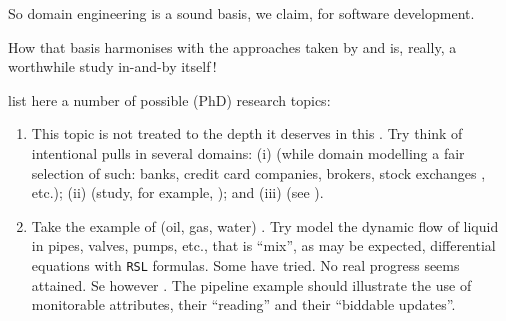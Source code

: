 \pind So domain engineering is a sound basis, we claim, for software
      development.

\pind How that basis harmonises with the approaches taken by
      \cite{Lamsweerde} and 
      \cite{Jackson2010Facs} is, really, a worthwhile study    
      in-and-by itself\,!
\afslut
\afslut

\label{Possible Research Topics}

\begynd
\pind {} list here a number of possible (PhD) research topics:
\begin{enumerate}
\item \label{rp:Intentional Pull}  This topic is not treated to the depth
      it deserves in this \primer. Try think of intentional pulls in
      several domains: (i) 
      (while domain modelling a fair selection of such: banks, credit
      card companies, brokers, stock exchanges \cite{db:tse:2010},
      etc.); (ii)  (study, for example,
      \cite{db04:railway,db97:r:UNUIIST:93,train-ifip-wcc2004-db1,train-ifip-wcc2004-mp,%
            train-ifip-wcc2004-db2,db02-amore-ros,db02-amore-maint,db03:ifac-cts2003,dines-idpt-02}); 
      and (iii)  (see \cite{BjornerContainer2018}). 
\mnewfoil
\item \label{rp:Discrete vs Continuous}   Take 
      the example of (oil, gas, water) . 
      Try model the dynamic flow of liquid in pipes, valves, pumps,
      etc., that is ``mix'', as may be expected, differential
      equations with \texttt{RSL} formulas. Some have tried. No real
      progress seems attained. Se however
      \cite{rTiMo2018,BigrTiMo2021}.
      The pipeline example should illustrate the use of monitorable
      attributes, their ``reading'' and their ``biddable updates''.


\end{enumerate}
